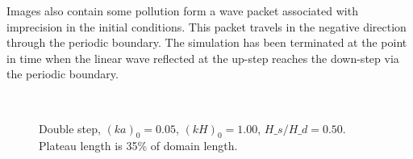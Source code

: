 Images also contain some pollution form a wave packet associated with imprecision in the initial conditions. This packet travels in the negative direction through the periodic boundary.
The simulation has been terminated at the point in time when the linear wave reflected at the up-step reaches the down-step via the periodic boundary. 


\begin{figure}[h!ptb]%
\centering
{}\\
%
\caption{Double step, $(ka)_0 = 0.05$, $(kH)_0 = 1.00$, $H\_s/H\_d = 0.50$. Plateau length is 35\% of domain length.}%
\label{fig:res:double}%
\end{figure}






%